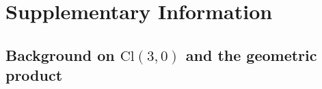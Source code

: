 \section{Supplementary Information}\label{sec:supp}




\subsection{Background on \texorpdfstring{$\mathrm{Cl}(3,0)$}{Cl(3,0)} and the geometric product}\label{supp:prelim}

